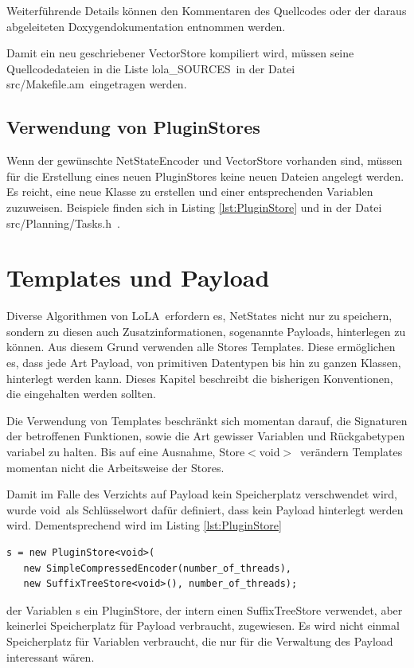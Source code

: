\documentclass[12pt,a4paper,titlepage]{scrartcl}
\renewcommand \( {\left (}
\renewcommand \) {\right )}
\renewcommand \[ {\left [}
\renewcommand \] {\right ]}
\newcommand \Flqq {\flqq\ }
\newcommand{\lola}{\frqq LoLA\Flqq}
\begin{document}
Weiterführende Details können den Kommentaren des Quellcodes oder der daraus abgeleiteten Doxygendokumentation entnommen werden.

Damit ein neu geschriebener VectorStore kompiliert wird, müssen seine Quellcodedateien in die Liste \frqq lola\_SOURCES\Flqq in der Datei \frqq src/Makefile.am\Flqq eingetragen werden.

\subsection{Verwendung von PluginStores}
Wenn der gewünschte NetStateEncoder und VectorStore vorhanden sind, müssen für die Erstellung eines neuen PluginStores keine neuen Dateien angelegt werden. Es reicht, eine neue Klasse zu erstellen und einer entsprechenden Variablen zuzuweisen. Beispiele finden sich in Listing \ref{lst:PluginStore} und in der Datei \frqq src/Planning/Tasks.h\Flqq.

\section{Templates und Payload}
Diverse Algorithmen von \lola erfordern es, NetStates nicht nur zu speichern, sondern zu diesen auch Zusatzinformationen, sogenannte Payloads, hinterlegen zu können. Aus diesem Grund verwenden alle Stores Templates. Diese ermöglichen es, dass jede Art Payload, von primitiven Datentypen bis hin zu ganzen Klassen, hinterlegt werden kann. Dieses Kapitel beschreibt die bisherigen Konventionen, die eingehalten werden sollten.

Die Verwendung von Templates beschränkt sich momentan darauf, die Signaturen der betroffenen Funktionen, sowie die Art gewisser Variablen und Rückgabetypen variabel zu halten. Bis auf eine Ausnahme,
\frqq Store$<$void$>$\Flqq verändern Templates momentan nicht die Arbeitsweise der Stores.

Damit im Falle des Verzichts auf Payload kein Speicherplatz verschwendet wird, wurde \frqq void\Flqq als Schlüsselwort dafür definiert, dass kein Payload hinterlegt werden wird. Dementsprechend wird im Listing \ref{lst:PluginStore}

\begin{center}
\begin{minipage}{0.7\textwidth}
\lstset{language=C++}
\begin{lstlisting}[label=lst:PluginStore,caption={Erstellung eines PluginStores}]
s = new PluginStore<void>(
   new SimpleCompressedEncoder(number_of_threads),
   new SuffixTreeStore<void>(), number_of_threads);\end{lstlisting}
\end{minipage}
\end{center}
%
der Variablen s ein PluginStore, der intern einen SuffixTreeStore verwendet, aber keinerlei Speicherplatz für Payload verbraucht, zugewiesen. Es wird nicht einmal Speicherplatz für Variablen verbraucht, die nur für die Verwaltung des Payload interessant wären.
\end{document}
